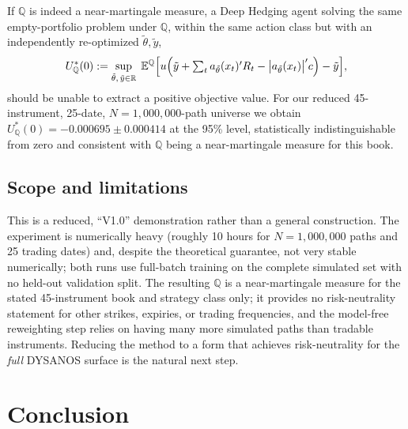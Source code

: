 \documentclass[11pt,a4paper]{article}
\newcommand{\R}{\mathbb{R}}
\newcommand{\E}{\mathbb{E}}
\newcommand{\Q}{\mathbb{Q}}
\renewcommand{\Q}{\mathbb{Q}}
\begin{document}
If $\Q$ is indeed a near-martingale measure, a Deep Hedging agent solving the
same empty-portfolio problem under $\Q$, within the same action class but
with an independently re-optimized $\tilde\theta,\tilde y$,
\begin{equation}
  U_\Q^*(0):=\sup_{\tilde\theta,\,\tilde y\in\R}\;
  \E^{\Q}\Bigl[
    u\Bigl(\tilde y+\textstyle\sum_t a_{\tilde\theta}(x_t)'R_t-\bigl|a_{\tilde\theta}(x_t)\bigr|'c\Bigr)-\tilde y
  \Bigr],
  \label{eq:rn-confirm}
\end{equation}
should be unable to extract a positive objective value.  For our reduced
45-instrument, 25-date, $N=1{,}000{,}000$-path universe we obtain
$U_\Q^*(0)=-0.000695\pm0.000414$ at the 95\% level, statistically
indistinguishable from zero and consistent with $\Q$ being a near-martingale
measure for this book.

\subsection{Scope and limitations}
\label{sec:risk-neutral-scope}

This is a reduced, ``V1.0'' demonstration rather than a general construction.
The experiment is numerically heavy (roughly 10 hours for $N=1{,}000{,}000$
paths and 25 trading dates) and, despite the theoretical guarantee, not very
stable numerically; both runs use full-batch training on the complete
simulated set with no held-out validation split.  The resulting $\Q$ is a
near-martingale measure for the stated 45-instrument book and strategy class
only; it provides no risk-neutrality statement for other strikes, expiries,
or trading frequencies, and the model-free reweighting step relies on having
many more simulated paths than tradable instruments.  Reducing the method to
a form that achieves risk-neutrality for the \emph{full} DYSANOS surface is
the natural next step.

\section{Conclusion}
\end{document}
